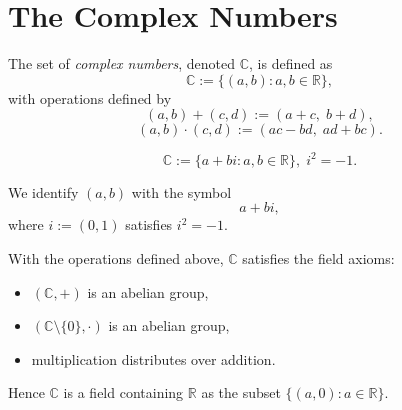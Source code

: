 
\section{The Complex Numbers}

\begin{definition}
\label{def:complex-numbers}
The set of \emph{complex numbers}, denoted $\mathbb{C}$, is defined as
\[
\mathbb{C} := \{(a,b) : a,b \in \mathbb{R}\},
\]
with operations defined by
\[
(a,b) + (c,d) := (a+c,\; b+d),
\]
\[
(a,b)\cdot(c,d) := (ac - bd,\; ad + bc).
\]
\end{definition}

\begin{remark*}
\[ \mathbb{C} := \{a+bi : a,b\in\mathbb{R}\},\; i^2=-1. \]
\end{remark*}

\begin{remark*}[Flash]
\end{remark*}

\begin{remark*}
We identify $(a,b)$ with the symbol
\[
a + bi,
\]
where $i := (0,1)$ satisfies $i^2 = -1$.
\end{remark*}

\begin{remark*}
With the operations defined above, $\mathbb{C}$ satisfies the field axioms:

\begin{itemize}
\item $(\mathbb{C}, +)$ is an abelian group,
\item $(\mathbb{C}\setminus\{0\}, \cdot)$ is an abelian group,
\item multiplication distributes over addition.
\end{itemize}

Hence $\mathbb{C}$ is a field containing $\mathbb{R}$ as the subset
$\{(a,0): a \in \mathbb{R}\}$.
\end{remark*}